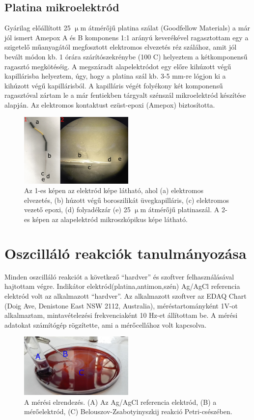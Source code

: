 \subsection{Platina mikroelektród}
Gyárilag előállított 25 $\upmu$m átmérőjű platina szálat (Goodfellow Materials) a már jól ismert Amepox A és B komponens 1:1 arányú keverékével ragasztottam egy a szigetelő műanyagától megfosztott elektromos elvezetés réz szálához, amit jól bevált módon kb. 1 órára szárítószekrénybe (100 \textdegree C) helyeztem a kétkomponensű ragasztó megkötéséig.  A megszáradt alapelektródot egy előre kihúzott végű kapillárisba helyeztem, úgy, hogy a platina szál kb. 3-5 mm-re lógjon ki a kihúzott végű kapillárisból. A kapilláris végét folyékony két komponensű ragasztóval zártam le a már fentiekben tárgyalt szénszál mikroelektród készítése alapján. Az elektromos kontaktust ezüst-epoxi (Amepox) biztosította.
\begin{figure}[h]
\centering
\includegraphics[width=0.5\textwidth]{img/platina.png}
\caption{Az 1-es képen az elektród képe látható, ahol (a) elektromos elvezetés, (b) húzott végű boroszilikát üvegkapilláris, (c) elektromos vezető epoxi, (d) folyadékzár  (e) 25 $\upmu$m átmérőjű platinaszál. A 2-es képen az alapelektród mikroszkópikus képe látható.}
\label{fig:ionophores}
\end{figure}


\section{Oszcilláló reakciók tanulmányozása} 

Minden oszcilláló reakciót a következő “hardver” és szoftver felhasználásával hajtottam végre. Indikátor elektród(platina,antimon,szén) Ag/AgCl referencia elektród volt az alkalmazott “hardver”.  Az alkalmazott szoftver az EDAQ Chart (Doig Ave, Denistone East NSW 2112, Australia),  méréstartományként 1V-ot alkalmaztam, mintavételezési frekvenciaként 10 Hz-et állítottam be. A mérési adatokat számítógép rögzítette, ami a mérőcellához volt kapcsolva.

\begin{figure}[h!]
\centering
\includegraphics[width=0.5\textwidth]{img/setup.png}
\caption{A mérési elrendezés. (A) Az Ag/AgCl referencia elektród, (B) a mérőelektród, (C) Belouszov-Zsabotyinyszkij reakció Petri-csészében.}
\label{fig:setup}
\end{figure}


